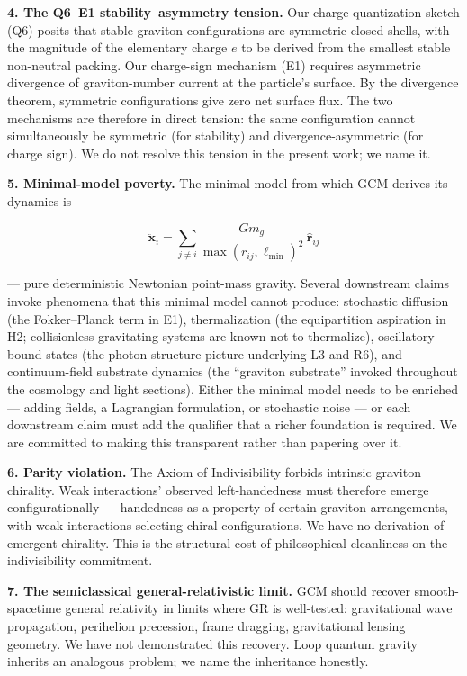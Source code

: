 \documentclass[12pt]{article}
\theoremstyle{definition}
\theoremstyle{remark}
\begin{document}
\textbf{4. The Q6--E1 stability--asymmetry tension.} Our
charge-quantization sketch (Q6) posits that stable graviton
configurations are symmetric closed shells, with the magnitude of the
elementary charge \(e\) to be derived from the smallest stable
non-neutral packing. Our charge-sign mechanism (E1) requires asymmetric
divergence of graviton-number current at the particle's surface. By the
divergence theorem, symmetric configurations give zero net surface flux.
The two mechanisms are therefore in direct tension: the same
configuration cannot simultaneously be symmetric (for stability) and
divergence-asymmetric (for charge sign). We do not resolve this tension
in the present work; we name it.

\textbf{5. Minimal-model poverty.} The minimal model from which GCM
derives its dynamics is

\[\ddot{\mathbf{x}}_i = \sum_{j\neq i} \frac{Gm_g}{\max(r_{ij},\ell_{\min})^2}\,\hat{\mathbf{r}}_{ij}\]

--- pure deterministic Newtonian point-mass gravity. Several downstream
claims invoke phenomena that this minimal model cannot produce:
stochastic diffusion (the Fokker--Planck term in E1), thermalization
(the equipartition aspiration in H2; collisionless gravitating systems
are known not to thermalize), oscillatory bound states (the
photon-structure picture underlying L3 and R6), and continuum-field
substrate dynamics (the ``graviton substrate'' invoked throughout the
cosmology and light sections). Either the minimal model needs to be
enriched --- adding fields, a Lagrangian formulation, or stochastic
noise --- or each downstream claim must add the qualifier that a richer
foundation is required. We are committed to making this transparent
rather than papering over it.

\textbf{6. Parity violation.} The Axiom of Indivisibility forbids
intrinsic graviton chirality. Weak interactions' observed
left-handedness must therefore emerge configurationally --- handedness
as a property of certain graviton arrangements, with weak interactions
selecting chiral configurations. We have no derivation of emergent
chirality. This is the structural cost of philosophical cleanliness on
the indivisibility commitment.

\textbf{7. The semiclassical general-relativistic limit.} GCM should
recover smooth-spacetime general relativity in limits where GR is
well-tested: gravitational wave propagation, perihelion precession,
frame dragging, gravitational lensing geometry. We have not demonstrated
this recovery. Loop quantum gravity inherits an analogous problem; we
name the inheritance honestly.
\end{document}
